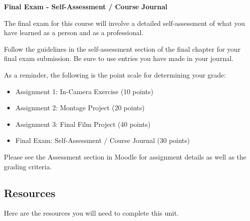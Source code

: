 \documentclass[
  letterpaper,
  DIV=11,
  numbers=noendperiod]{scrreprt}
\providecommand{\tightlist}{%
  \setlength{\itemsep}{0pt}\setlength{\parskip}{0pt}}\usepackage{longtable,booktabs,array}
\begin{document}
\textbf{Final Exam - Self-Assessment / Course Journal}

The final exam for this course will involve a detailed self-assessment
of what you have learned as a person and as a professional.

Follow the guidelines in the self-assessment section of the final
chapter for your final exam submission. Be sure to use entries you have
made in your journal.

As a reminder, the following is the point scale for determining your
grade:

\begin{itemize}
\tightlist
\item
  Assignment 1: In-Camera Exercise (10 points)
\item
  Assignment 2: Montage Project (20 points)
\item
  Assignment 3: Final Film Project (40 points)
\item
  Final Exam: Self-Assessment / Course Journal (30 points)
\end{itemize}

\begin{tcolorbox}[enhanced jigsaw, opacityback=0, colframe=quarto-callout-note-color-frame, leftrule=.75mm, colback=white, toprule=.15mm, breakable, arc=.35mm, rightrule=.15mm, bottomrule=.15mm, left=2mm]
\begin{minipage}[t]{5.5mm}
\textcolor{quarto-callout-note-color}{\faInfo}
\end{minipage}%
\begin{minipage}[t]{\textwidth - 5.5mm}

Please see the Assessment section in Moodle for assignment details as
well as the grading criteria.

\end{minipage}%
\end{tcolorbox}

\subsection*{Resources}\label{resources-9}

Here are the resources you will need to complete this unit.
\end{document}
